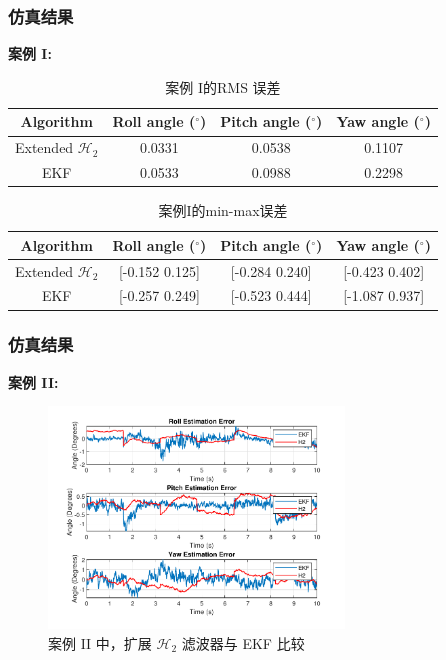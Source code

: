 \documentclass{beamer}
\begin{document}
\begin{frame}
	\frametitle{仿真结果}
	\textbf{案例 I:} 
	\begin{table}[h]
		\caption{案例 I的RMS 误差} \label{RMS_low}
		\vspace{-0.3cm}
		\begin{center}
			\renewcommand{\arraystretch}{1.5}
			\begin{tabular}{|c||c|c|c|}
				\hline
				Algorithm & Roll angle (${}^\circ$) & Pitch angle (${}^\circ$) & Yaw angle (${}^\circ$)\\
				\hline \hline
				Extended $\mathcal{H}_2$ & 0.0331 & 0.0538 & 0.1107\\
				\hline
				EKF & 0.0533 & 0.0988 & 0.2298\\
				\hline
			\end{tabular}
		\end{center}
	\end{table}
\begin{table}[h]
	\caption{案例I的min-max误差}\label{min-max_low}
	\vspace{-0.2cm}
	\begin{center}
		\renewcommand{\arraystretch}{1.5}
		\begin{tabular}{|c||c|c|c|}
			\hline
			Algorithm & Roll angle (${}^\circ$) & Pitch angle (${}^\circ$) & Yaw angle (${}^\circ$)\\
			\hline \hline
			Extended $\mathcal{H}_2$ &  [-0.152 0.125] & [-0.284 0.240] & [-0.423 0.402]\\
			\hline
			EKF & [-0.257 0.249] & [-0.523 0.444]& [-1.087 0.937]\\
			\hline
		\end{tabular}
	\end{center}
\end{table}

\end{frame}

\begin{frame}
	\frametitle{仿真结果}
\textbf{案例 II:} 
\begin{figure}[h]
	\centering
	\includegraphics[width=0.7\textwidth]{EH2_highangle.pdf}
	\caption{案例 II 中，扩展 $\mathcal{H}_2$ 滤波器与 EKF 比较}
	\label{comp_high}
\end{figure}
\end{frame}
\end{document}
